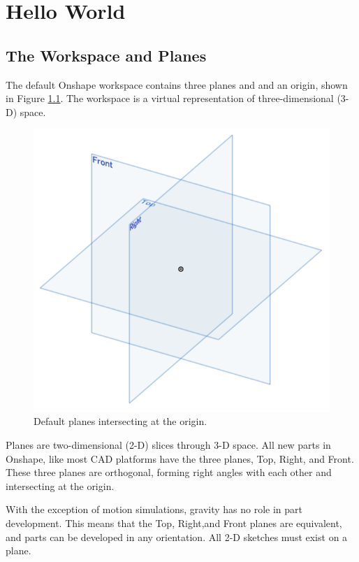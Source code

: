 \chapter{Hello World}

\section{The Workspace and Planes}
The default Onshape workspace contains three planes and
and an origin, shown in Figure \ref{chap01_planes}. The workspace is a virtual representation
of three-dimensional (3-D) space.

\begin{figure}[ht!]
\centerline{\includegraphics[width=5in]{figs/chap01_planes.png}}
\caption{Default planes intersecting at the origin.}
\label{chap01_planes}
\end{figure}

Planes are two-dimensional (2-D) slices through 3-D
space. All new parts in Onshape, like most CAD platforms
have the three planes, Top, Right, and Front. These
three planes are orthogonal, forming right angles
with each other and intersecting at the origin.

With the exception of motion simulations, gravity has no role in part development. This means that the Top, Right,and Front planes are equivalent, and parts can be developed in any orientation. All 2-D sketches must exist on a plane.

